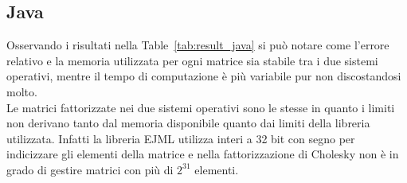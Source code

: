 \documentclass{report}
\begin{document}
            \subsection{Java}
                Osservando i risultati nella Table~\ref{tab:result_java} si può notare come l'errore relativo e la 
                memoria utilizzata per ogni matrice sia stabile tra i due sistemi operativi, mentre il tempo di 
                computazione è più variabile pur non discostandosi molto.\\
                Le matrici fattorizzate nei due sistemi operativi sono le stesse in quanto i limiti non derivano tanto
                dal memoria disponibile quanto dai limiti della libreria utilizzata. Infatti la libreria EJML utilizza
                interi a 32 bit con segno per indicizzare gli elementi della matrice e nella fattorizzazione di Cholesky
                non è in grado di gestire matrici con più di $2^{31}$ elementi.
                \begin{table}[h]
                    \centering
                    \caption{Risultati dei benchmark Java}
                    \label{tab:result_java}
                \end{table}
\end{document}

